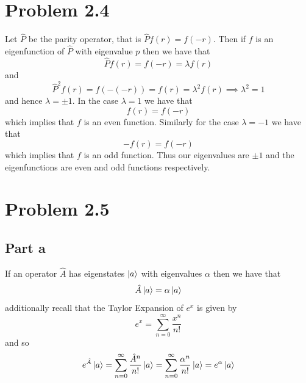 \documentclass[12pt]{report}
\begin{document}
\section*{Problem 2.4}
Let $\hat{P}$ be the parity operator, that is $\hat{P}f(r) = f(-r)$. Then if $f$ is an eigenfunction of $\hat{P}$ with eigenvalue $p$ then we have that
\begin{equation*}
  \hat{P}f(r) = f(-r) = \lambda f(r)
\end{equation*}
and 
\begin{equation*}
  \hat{P}^2 f(r) = f(-(-r)) = f(r) = \lambda^2 f(r) \implies \lambda^2 = 1
\end{equation*}
and hence $\lambda = \pm 1$. In the case $\lambda =1 $ we have that
\begin{equation*}
  f(r) = f(-r)
\end{equation*}
which implies that $f$ is an even function. Similarly for the case $\lambda = -1$ we have that
\begin{equation*}
  -f(r) = f(-r)
\end{equation*}
which implies that $f$ is an odd function. Thus our eigenvalues are $\pm 1$ and the eigenfunctions are even and odd functions respectively. 

\section*{Problem 2.5}
\subsection*{Part a}
If an operator $\hat{A}$ has eigenstates $\ket{a}$ with eigenvalues $\alpha$ then we have that 
\begin{equation*}
  \hat{A}\ket{a} = \alpha \ket{a}
\end{equation*}
additionally recall that the Taylor Expansion of $e^x$ is given by
\begin{equation*}
  e^x = \sum_{n=0}^\infty \frac{x^n}{n!}
\end{equation*}
and so 
\begin{equation*}
  e^{\hat{A}}\ket{a} = \sum_{n=0}^\infty \frac{\hat{A}^n}{n!}\ket{a} = \sum_{n=0}^\infty \frac{\alpha^n}{n!}\ket{a} = e^\alpha \ket{a}
\end{equation*}
\end{document}
